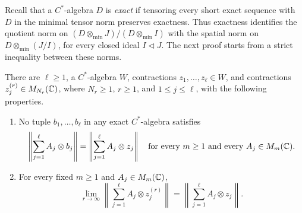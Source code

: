 Recall that a \(C^*\)-algebra \(D\) is \emph{exact} if tensoring every
short exact sequence with \(D\) in the minimal tensor norm preserves
exactness.  Thus exactness identifies the quotient norm on
\((D\otimes_{\min}J)/(D\otimes_{\min}I)\) with the spatial norm on
\(D\otimes_{\min}(J/I)\), for every closed ideal \(I\triangleleft J\).
The next proof starts from a strict inequality between these norms.

\begin{lemma}
\label{lem:forbidden-tuple}
There are \(\ell\ge1\), a \(C^*\)-algebra \(W\), contractions
\(z_1,\ldots,z_\ell\in W\), and contractions
\(z_j^{(r)}\in M_{N_r}(\mathbb C)\), where \(N_r\ge1\), \(r\ge1\), and
\(1\le j\le\ell\), with the following properties.
\begin{enumerate}[label=\textup{(\roman*)}]
\item No tuple \(b_1,\ldots,b_\ell\) in any exact \(C^*\)-algebra
satisfies
\begin{equation}\label{eq:forbidden-tuple}
 \left\|\sum_{j=1}^{\ell} A_j\otimes b_j\right\|
 =\left\|\sum_{j=1}^{\ell} A_j\otimes z_j\right\|
 \quad\text{for every }m\ge1\text{ and every }A_j\in M_m(\mathbb C).
\end{equation}
\item For every fixed \(m\ge1\) and \(A_j\in M_m(\mathbb C)\),
\begin{equation}\label{eq:tuple-approximations}
 \lim_{r\to\infty}
 \left\|\sum_{j=1}^{\ell} A_j\otimes z_j^{(r)}\right\|
 =\left\|\sum_{j=1}^{\ell} A_j\otimes z_j\right\|.
\end{equation}
\end{enumerate}
\end{lemma}

